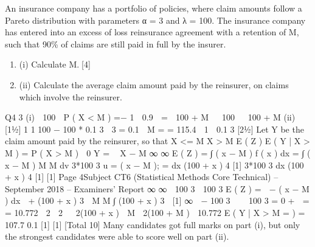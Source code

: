 \documentclass[a4paper,12pt]{article}
\begin{document}
An insurance company has a portfolio of policies, where claim amounts follow a
Pareto distribution with parameters α = 3 and λ = 100. The insurance company has
entered into an excess of loss reinsurance agreement with a retention of M, such that
90\% of claims are still paid in full by the insurer.
\begin{enumerate}
\item (i) Calculate M.[4]
\item(ii) Calculate the average claim amount paid by the reinsurer, on claims which
involve the reinsurer.
\end{enumerate}

\newpage 
Q4
3
(i)
 100 
P ( X < M ) =−
1 
0.9
 =
 100 + M 
 100

 100 + M
(ii)
[11⁄2]
1
1
100 − 100 * 0.1 3

3
=
0.1
⇒
M
=
= 115.4

1

0.1 3
[21⁄2]
Let Y be the claim amount paid by the reinsurer, so that
X <= M
X > M
E ( Z )
E ( Y | X > M ) =
P ( X > M )
 0
Y =
 X − M
∞
∞
E ( Z ) =
∫ ( x − M ) f ( x ) dx =
∫ ( x − M )
M
M
dv
3*100 3
u =
( x − M ); =
dx (100 + x ) 4
[1]
3*100 3
dx
(100 + x ) 4
[1]
[1]
Page 4Subject CT6 (Statistical Methods Core Technical) – September 2018 – Examiners’ Report
∞
∞

100 3 
100 3
E ( Z ) =  − ( x − M )
dx
 +
(100 + x ) 3  M M ∫ (100 + x ) 3

[1]
∞
 − 100 3 


100 3
=
0 + 
=
=
10.772

2 
2 
 2(100 + x )  M  2(100 + M ) 
10.772
E ( Y | X > M =
)
= 107.7
0.1
[1]
[1]
[Total 10]
Many candidates got full marks on part (i), but only the strongest candidates were able to
score well on part (ii).
\end{document}
